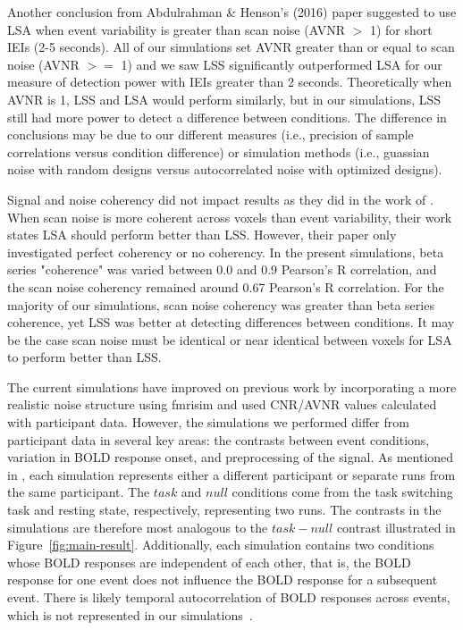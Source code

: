\documentclass[phd,appendix,figures]{uithesis}
\begin{document}
Another conclusion from Abdulrahman \& Henson's (2016) paper suggested to
use LSA when event variability is greater than scan noise (AVNR $>$ 1) for short IEIs (2-5 seconds).
All of our simulations set AVNR greater than or equal to scan noise (AVNR $>=$ 1) and we saw
LSS significantly outperformed LSA for our measure of detection power with IEIs greater than 2 seconds.
Theoretically when AVNR is 1, LSS and LSA would perform similarly, but in our simulations,
LSS still had more power to detect a difference between conditions.
The difference in conclusions may be due to our different measures (i.e., precision of sample correlations versus condition difference)
or simulation methods (i.e., guassian noise with random designs versus autocorrelated noise with optimized designs).

Signal and noise coherency did not impact results as they did in the work of \cite[Abdulrahman \& Henson (2016)]{Abdulrahman2016}.
When scan noise is more coherent across voxels than event variability,
their work states LSA should perform better than LSS.
However, their paper only investigated perfect coherency or no coherency.
In the present simulations, beta series "coherence" was varied between 0.0 and 0.9 Pearson's R correlation,
and the scan noise coherency remained around 0.67 Pearson's R correlation.
For the majority of our simulations, scan noise coherency was greater than beta series
coherence, yet LSS was better at detecting differences between conditions.
It may be the case scan noise must be identical or near identical between voxels
for LSA to perform better than LSS.

The current simulations have improved on previous work by incorporating a more
realistic noise structure using fmrisim and used CNR/AVNR values calculated with participant data.
However, the simulations we performed differ from participant data in several key areas:
the contrasts between event conditions,
variation in BOLD response onset, and preprocessing of the signal.
As mentioned in , each simulation represents
either a different participant or separate runs from the same participant.
The $task$ and $null$ conditions come from the task switching task and resting state,
respectively, representing two runs.
The contrasts in the simulations are therefore most analogous to the $task - null$
contrast illustrated in Figure~\ref{fig:main-result}.
Additionally, each simulation contains two conditions whose BOLD responses
are independent of each other, that is, the BOLD response for one event
does not influence the BOLD response for a subsequent event.
There is likely temporal autocorrelation of BOLD responses across events,
which is not represented in our simulations~\cite{Abdulrahman2016}.
\end{document}
